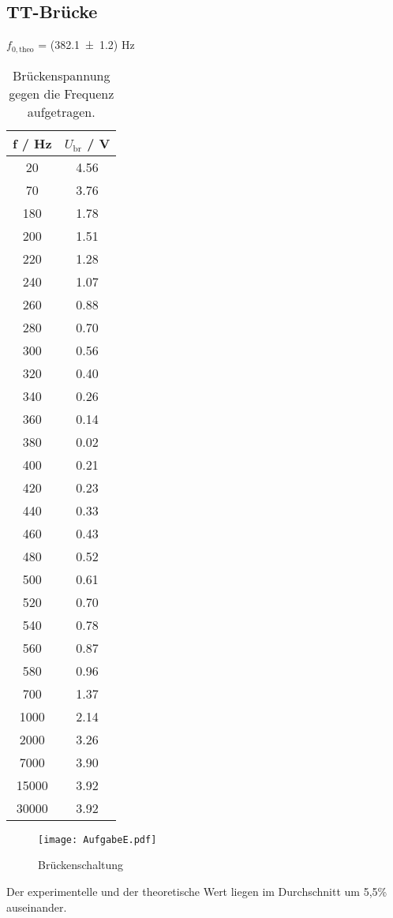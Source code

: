 \subsection{TT-Brücke}

$f_{0,\text{theo}}$ = (\num{382.1 +- 1.2}) Hz

\begin{table}[H]
  \centering
  \begin{tabular}{c c}
    \toprule
    f / Hz & $U_\text{br}$ / V \\
    \midrule
      20	  &  4.56  \\
      70	  &  3.76  \\
      180	  &  1.78  \\
      200	  &  1.51  \\
      220	  &  1.28  \\
      240	  &  1.07  \\
      260	  &  0.88  \\
      280	  &  0.70  \\
      300	  &  0.56  \\
      320	  &  0.40  \\
      340	  &  0.26  \\
      360	  &  0.14  \\
      380	  &  0.02  \\
      400	  &  0.21  \\
      420	  &  0.23  \\
      440	  &  0.33  \\
      460	  &  0.43  \\
      480	  &  0.52  \\
      500	  &  0.61  \\
      520	  &  0.70  \\
      540	  &  0.78  \\
      560	  &  0.87  \\
      580	  &  0.96  \\
      700	  &  1.37  \\
      1000	&  2.14  \\
      2000	&  3.26  \\
      7000	&  3.90  \\
      15000	&  3.92  \\
      30000	&  3.92  \\
  \end{tabular}
  \caption{Brückenspannung gegen die Frequenz aufgetragen.}
  \label{tab:Brückenspannung}
\end{table}

\begin{figure}[H]
  \centering
  \texttt{[image: AufgabeE.pdf]}
  \caption{Brückenschaltung}
  \label{fig:AufgabeE}
\end{figure}
Der experimentelle und der theoretische Wert liegen im Durchschnitt um 5,5\% auseinander.
